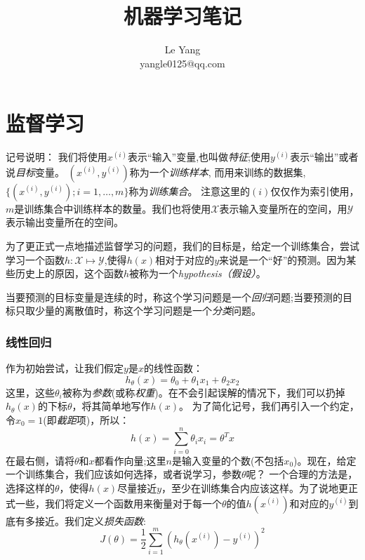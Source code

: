 \documentclass[hyperref, UTF8]{ctexart}
\begin{document}
\title{机器学习笔记}
\author{
Le Yang\\
yangle0125@qq.com
}
\date{}
\maketitle

\tableofcontents

\part{监督学习}
记号说明：
我们将使用$x^{(i)}$表示“输入”变量,也叫做\emph{特征};使用$y^{(i)}$表示“输出”或者说\emph{目标}变量。
$(x^{(i)}, y^{(i)})$称为一个\emph{训练样本}, 而用来训练的数据集,$\lbrace(x^{(i)}, y^{(i)}); i = 1, \dots, m\rbrace$称为\emph{训练集合}。
注意这里的$(i)$仅仅作为索引使用，$m$是训练集合中训练样本的数量。我们也将使用$\mathcal{X}$表示输入变量所在的空间，用$\mathcal{Y}$表示输出变量所在的空间。

为了更正式一点地描述监督学习的问题，我们的目标是，给定一个训练集合，尝试学习一个函数$h:\mathcal{X} \mapsto \mathcal{Y}$,使得$h(x)$相对于对应的$y$来说是一个“好”的预测。因为某些历史上的原因，这个函数$h$被称为一个\emph{hypothesis（假设）}。

当要预测的目标变量是连续的时，称这个学习问题是一个\emph{回归}问题;当要预测的目标只取少量的离散值时，称这个学习问题是一个\emph{分类}问题。

\section{线性回归}
作为初始尝试，让我们假定$y$是$x$的线性函数：
\begin{equation*}
h_\theta(x) = \theta_0 + \theta_1x_1 + \theta_2x_2
\end{equation*}
这里，这些$\theta_i$被称为\emph{参数}(或称\emph{权重})。在不会引起误解的情况下，我们可以扔掉$h_\theta(x)$的下标$\theta$，将其简单地写作$h(x)$。
为了简化记号，我们再引入一个约定，令$x_0 = 1$(即\emph{截距}项)，所以：
\begin{equation}
h(x) = \sum_{i = 0}^n\theta_ix_i = \theta^Tx
\end{equation}
在最右侧，请将$\theta$和$x$都看作向量;这里$n$是输入变量的个数(不包括$x_0$)。现在，给定一个训练集合，我们应该如何选择，或者说学习，参数$\theta$呢？
一个合理的方法是，选择这样的$\theta$，使得$h(x)$尽量接近$y$，至少在训练集合内应该这样。为了说地更正式一些，我们将定义一个函数用来衡量对于每一个$\theta$的值$h(x^{(i)})$和对应的$y^{(i)}$到底有多接近。我们定义\emph{损失函数}:
\begin{equation}
J(\theta) = \frac{1}{2}\sum^m_{i = 1}(h_\theta(x^{(i)}) - y^{(i)})^2
\end{equation}
\end{document}
